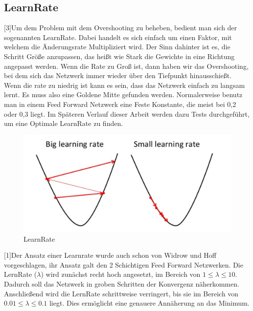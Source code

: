 \documentclass[12pt]{article}
\begin{document}
\subsection{LearnRate}[3]Um dem Problem mit dem Overshooting zu beheben, bedient man sich der sogenannten LearnRate. Dabei handelt es sich einfach um einen Faktor, mit welchem die Änderungsrate Multipliziert wird. Der Sinn dahinter ist es, die Schritt Größe anzupassen, das heißt wie Stark die Gewichte in eine Richtung angepasst werden. Wenn die Rate zu Groß ist, dann haben wir das Overshooting, bei dem sich das Netzwerk immer wieder über den Tiefpunkt hinausschießt. Wenn die rate zu niedrig ist kann es sein, dass das Netzwerk einfach zu langsam lernt. Es muss also eine Goldene Mitte gefunden werden. Normalerweise benutz man in einem Feed Forward Netzwerk eine Feste Konstante, die meist bei 0,2 oder 0,3 liegt. Im Späteren Verlauf dieser Arbeit werden dazu Tests durchgeführt, um eine Optimale LearnRate zu finden.
\begin{figure}[H]
\centering
\includegraphics[scale=0.250]{./Images/Pasted image 20230917181526.png}
\caption{LearnRate}
\label{Was kommt hier rein?}
\end{figure}
[1]Der Ansatz einer Learnrate wurde auch schon von Widrow und Hoff vorgeschlagen, ihr Ansatz galt den 2 Schichtigen Feed Forward Netzwerken. Die LernRate ($\lambda$) wird zunächst recht hoch angesetzt, im Bereich von $1 \le \lambda \le 10$. Dadurch soll das Netzwerk in groben Schritten der Konvergenz näherkommen. Anschließend wird die LernRate schrittweise verringert, bis sie im Bereich von $0.01 \le \lambda \le 0.1$ liegt. Dies ermöglicht eine genauere Annäherung an das Minimum.
\end{document}
